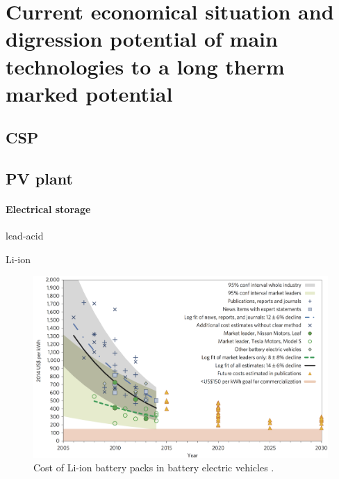 \chapter{Current economical situation and digression potential of main technologies to a long therm marked potential}
\section{CSP}
\cite{Smith2012}

\section{PV plant}

\subsubsection{Electrical storage}
lead-acid



Li-ion\cite{Nykvist2015}

\begin{figure}[htbp]  
\centering
\includegraphics[width=0.95\linewidth]{FIG/CostofLi-ion}
\caption[Cost of Li-ion battery packs in battery electric vehicles.]{Cost of Li-ion battery packs in battery electric vehicles \cite{Nykvist2015}.}\label{CostofLi-ion}
\end{figure}

\pagebreak

